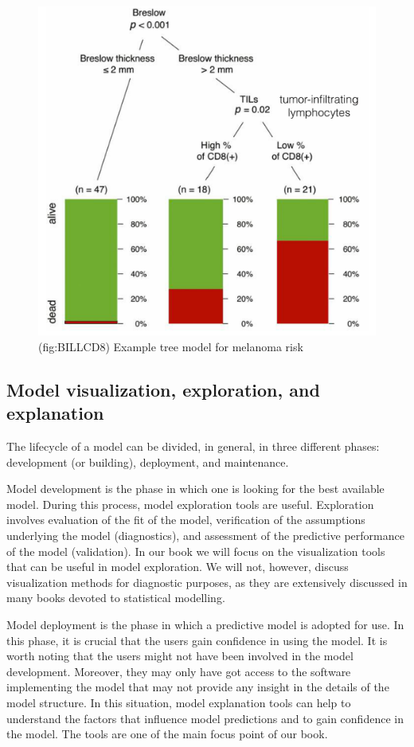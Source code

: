 \documentclass[12pt,]{krantz}
\theoremstyle{definition}
\theoremstyle{definition}
\theoremstyle{definition}
\theoremstyle{remark}
\begin{document}
\begin{figure}

{\centering \includegraphics[width=0.5\linewidth]{figure/wbBILL8model} 

}

\caption{(fig:BILLCD8) Example tree model for melanoma risk}\label{fig:BILLCD8}
\end{figure}

\hypertarget{model-visualization-exploration-and-explanation}{%
\subsection{Model visualization, exploration, and
explanation}\label{model-visualization-exploration-and-explanation}}

The lifecycle of a model can be divided, in general, in three different
phases: development (or building), deployment, and maintenance.

Model development is the phase in which one is looking for the best
available model. During this process, model exploration tools are
useful. Exploration involves evaluation of the fit of the model,
verification of the assumptions underlying the model (diagnostics), and
assessment of the predictive performance of the model (validation). In
our book we will focus on the visualization tools that can be useful in
model exploration. We will not, however, discuss visualization methods
for diagnostic purposes, as they are extensively discussed in many books
devoted to statistical modelling.

Model deployment is the phase in which a predictive model is adopted for
use. In this phase, it is crucial that the users gain confidence in
using the model. It is worth noting that the users might not have been
involved in the model development. Moreover, they may only have got
access to the software implementing the model that may not provide any
insight in the details of the model structure. In this situation, model
explanation tools can help to understand the factors that influence
model predictions and to gain confidence in the model. The tools are one
of the main focus point of our book.
\end{document}

